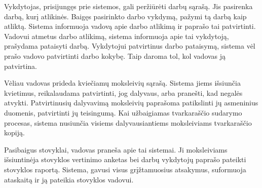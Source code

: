 Vykdytojas, prisijungęs prie sistemos, gali peržiūrėti darbų sąrašą. 
Jis pasirenka darbą, kurį atlikinės. Baigęs pasirinkto darbo vykdymą, 
pažymi tą darbą kaip atliktą. Sistema informuoja vadovą apie darbo 
atlikimą ir paprašo tai patvirtinti. Vadovui atmetus darbo atlikimą, 
sistema informuoja apie tai vykdytoją, prašydama pataisyti darbą. 
Vykdytojui patvirtinus darbo pataisymą, sistema vėl prašo vadovo 
patvirtinti darbo kokybę. Taip daroma tol, kol vadovas ją patvirtina. 

Vėliau vadovas prideda kviečiamų moksleivių sąrašą. Sistema jiems 
išsiunčia kvietimus, reikalaudama patvirtinti, jog dalyvaus, 
arba pranešti, kad negalės atvykti. Patvirtinusių dalyvavimą 
moksleivių paprašoma patikslinti jų asmeninius duomenis, patvirtinti 
jų teisingumą. Kai užbaigiamas tvarkaraščio sudarymo procesas, 
sistema nusiunčia visiems dalyvausiantiems moksleiviams
tvarkaraščio kopiją.

Pasibaigus stovyklai, vadovas praneša apie tai sistemai. Ji moksleiviams
išsiuntinėja stovyklos vertinimo anketas bei darbų vykdytojų paprašo 
pateikti stovyklos raportą. Sistema, gavusi visus grįžtamuosius atsakymus,
suformuoja ataskaitą ir ją pateikia stovyklos vadovui.

